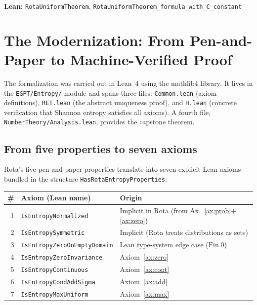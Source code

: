 \documentclass[12pt,a4paper]{article}
\theoremstyle{definition}
\newcommand{\lean}[1]{\texttt{#1}}
\begin{document}
\medskip\noindent
\textbf{Lean:} \lean{RotaUniformTheorem},
\lean{RotaUniformTheorem\_formula\_with\_C\_constant}

\section{The Modernization: From Pen-and-Paper to Machine-Verified Proof}
\label{sec:lean}

The formalization was carried out in Lean~4 using the mathlib4 library.
It lives in the \lean{EGPT/Entropy/} module and spans three files:
\lean{Common.lean} (axiom definitions), \lean{RET.lean} (the abstract
uniqueness proof), and \lean{H.lean} (concrete verification that Shannon
entropy satisfies all axioms).  A fourth file,
\lean{NumberTheory/Analysis.lean}, provides the capstone theorem.

\subsection{From five properties to seven axioms}

Rota's five pen-and-paper properties translate into seven explicit Lean
axioms bundled in the structure \lean{HasRotaEntropyProperties}:

\begin{center}
\begin{tabular}{@{}rll@{}}
\toprule
\textbf{\#} & \textbf{Axiom (Lean name)} & \textbf{Origin} \\
\midrule
1 & \lean{IsEntropyNormalized} & Implicit in Rota (from Ax.~\ref{ax:prob}+\ref{ax:zero}) \\
2 & \lean{IsEntropySymmetric} & Implicit (Rota treats distributions as sets) \\
3 & \lean{IsEntropyZeroOnEmptyDomain} & Lean type-system edge case ($\mathrm{Fin}\;0$) \\
4 & \lean{IsEntropyZeroInvariance} & Axiom~\ref{ax:zero} \\
5 & \lean{IsEntropyContinuous} & Axiom~\ref{ax:cont} \\
6 & \lean{IsEntropyCondAddSigma} & Axiom~\ref{ax:add} \\
7 & \lean{IsEntropyMaxUniform} & Axiom~\ref{ax:max} \\
\bottomrule
\end{tabular}
\end{center}
\end{document}
